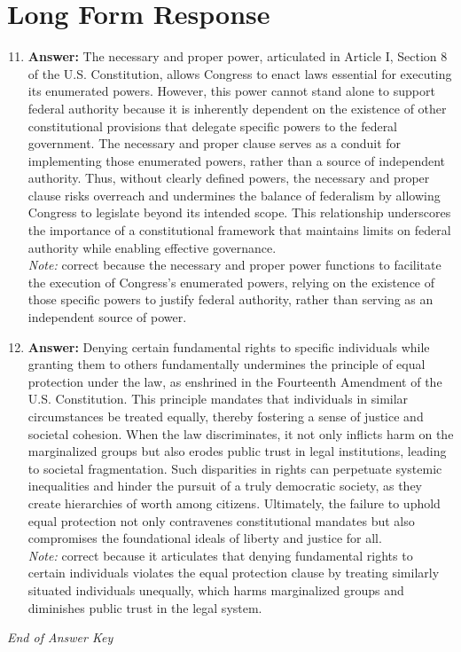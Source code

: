 \documentclass[12pt]{article}
\begin{document}
\section*{Long Form Response}
\begin{enumerate}[label=\arabic*.]
\setcounter{enumi}{10}
\item \textbf{Answer:} The necessary and proper power, articulated in Article I, Section 8 of the U.S. Constitution, allows Congress to enact laws essential for executing its enumerated powers. However, this power cannot stand alone to support federal authority because it is inherently dependent on the existence of other constitutional provisions that delegate specific powers to the federal government. The necessary and proper clause serves as a conduit for implementing those enumerated powers, rather than a source of independent authority. Thus, without clearly defined powers, the necessary and proper clause risks overreach and undermines the balance of federalism by allowing Congress to legislate beyond its intended scope. This relationship underscores the importance of a constitutional framework that maintains limits on federal authority while enabling effective governance.
\\ \textit{Note:} correct because the necessary and proper power functions to facilitate the execution of Congress's enumerated powers, relying on the existence of those specific powers to justify federal authority, rather than serving as an independent source of power.
\item \textbf{Answer:} Denying certain fundamental rights to specific individuals while granting them to others fundamentally undermines the principle of equal protection under the law, as enshrined in the Fourteenth Amendment of the U.S. Constitution. This principle mandates that individuals in similar circumstances be treated equally, thereby fostering a sense of justice and societal cohesion. When the law discriminates, it not only inflicts harm on the marginalized groups but also erodes public trust in legal institutions, leading to societal fragmentation. Such disparities in rights can perpetuate systemic inequalities and hinder the pursuit of a truly democratic society, as they create hierarchies of worth among citizens. Ultimately, the failure to uphold equal protection not only contravenes constitutional mandates but also compromises the foundational ideals of liberty and justice for all.
\\ \textit{Note:} correct because it articulates that denying fundamental rights to certain individuals violates the equal protection clause by treating similarly situated individuals unequally, which harms marginalized groups and diminishes public trust in the legal system.
\end{enumerate}

\vfill
\noindent\textit{End of Answer Key}
\end{document}

